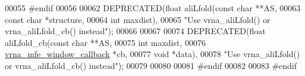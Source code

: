\begin{DoxyCode}
00055 \textcolor{preprocessor}{#endif}
00056 
00062 DEPRECATED(\textcolor{keywordtype}{float} aliLfold(\textcolor{keyword}{const} \textcolor{keywordtype}{char}  **AS,
00063                           \textcolor{keyword}{const} \textcolor{keywordtype}{char}  *structure,
00064                           \textcolor{keywordtype}{int}         maxdist),
00065            \textcolor{stringliteral}{"Use vrna\_aliLfold() or vrna\_aliLfold\_cb() instead"});
00066 
00067 
00074 DEPRECATED(\textcolor{keywordtype}{float} aliLfold\_cb(\textcolor{keyword}{const} \textcolor{keywordtype}{char}               **AS,
00075                              \textcolor{keywordtype}{int}                      maxdist,
00076                              \hyperlink{group__mfe__window_ga4f3e5bc214ef803074ace313cb9571b4}{vrna\_mfe\_window\_callback} *cb,
00077                              \textcolor{keywordtype}{void}                     *data),
00078            \textcolor{stringliteral}{"Use vrna\_aliLfold() or vrna\_aliLfold\_cb() instead"});
00079 
00080 
00081 \textcolor{preprocessor}{#endif}
00082 
00083 \textcolor{preprocessor}{#endif}
\end{DoxyCode}
